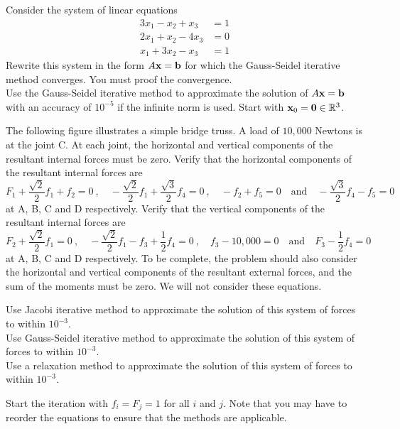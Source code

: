 \begin{question}
Consider the system of linear equations
\begin{align*}
3 x_1 - x_2 + x_3 &= 1 \\
2 x_1 + x_2 - 4 x_3 &= 0 \\
x_1 + 3 x_2 - x_3 &= 1
\end{align*}
 Rewrite this system in the form $A\mathbf{x} = \mathbf{b}$ for
which the Gauss-Seidel iterative method converges.  You must proof the
convergence.\\
 Use the Gauss-Seidel iterative method to approximate the
solution of $A\mathbf{x} = \mathbf{b}$ with an accuracy of $10^{-5}$ if the
infinite norm is used.  Start with $\mathbf{x}_0 = \mathbf{0} \in \mathbb{R}^3$.
\label{solvBQ8}
\end{question}

\begin{question}
The following figure illustrates a simple bridge truss.
A load of $10,000$ Newtons is at the joint C.  At each
joint, the horizontal and vertical components of the resultant
internal forces must be zero.  Verify that the horizontal components
of the resultant internal forces are
\[
F_1 + \frac{\sqrt{2}}{2} f_1 + f_2 = 0  \ , \quad
-\frac{\sqrt{2}}{2} f_1 + \frac{\sqrt{3}}{2} f_4  = 0 \ , \quad 
-f_2 + f_5 = 0 \quad \text{and} \quad -\frac{\sqrt{3}}{2} f_4 - f_5 = 0
\]
at A, B, C and D respectively.
Verify that the vertical components of the resultant internal forces are
\[
F_2 + \frac{\sqrt{2}}{2} f_1 = 0 \ , \quad
-\frac{\sqrt{2}}{2} f_1 - f_3 + \frac{1}{2} f_4 = 0 \ , \quad
f_3 - 10,000 = 0 \quad \text{and} \quad
F_3 - \frac{1}{2} f_4 =0
\]
at A, B, C and D respectively.  To be complete, the problem should
also consider the horizontal and vertical components of the resultant
external forces, and the sum of the moments must be zero.  We will not
consider these equations.

 Use Jacobi iterative method to approximate the solution of this
system of forces to within $10^{-3}$.\\
 Use Gauss-Seidel iterative method to approximate the solution of this
system of forces to within $10^{-3}$.\\
 Use a relaxation method to approximate the solution of this system
of forces to within $10^{-3}$.

Start the iteration with $f_i= F_j = 1$ for all $i$ and $j$.
Note that you may have to reorder the equations to ensure that the
methods are applicable.
\label{solvBQ9}
\end{question}

